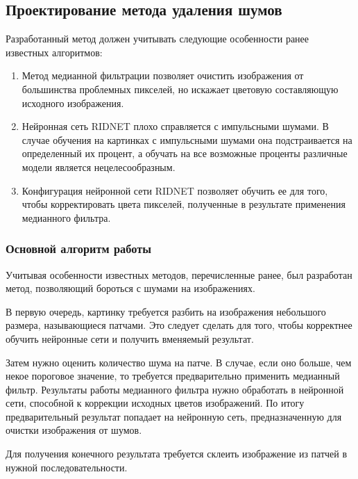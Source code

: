 \subsection{Проектирование метода удаления шумов}
Разработанный метод должен учитывать следующие особенности ранее известных алгоритмов:
\begin{enumerate}
	\item Метод медианной фильтрации позволяет очистить изображения от большинства проблемных пикселей, но искажает цветовую составляющую исходного изображения.
	\item Нейронная сеть RIDNET плохо справляется с импульсными шумами. 
	В случае обучения на картинках с импульсными шумами она подстраивается на определенный их процент, а обучать на все возможные проценты различные модели является нецелесообразным.
	\item Конфигурация нейронной сети RIDNET позволяет обучить ее для того, чтобы корректировать цвета пикселей, полученные в результате применения медианного фильтра.
\end{enumerate}

\subsubsection{Основной алгоритм работы}
Учитывая особенности известных методов, перечисленные ранее, был разработан метод, позволяющий бороться с шумами на изображениях.

В первую очередь, картинку требуется разбить на изображения небольшого размера, называющиеся патчами.
Это следует сделать для того, чтобы корректнее обучить нейронные сети и получить вменяемый результат.

Затем нужно оценить количество шума на патче.
В случае, если оно больше, чем некое пороговое значение, то требуется предварительно применить медианный фильтр.
Результаты работы медианного фильтра нужно обработать в нейронной сети, способной к коррекции исходных цветов изображений.
По итогу предварительный результат попадает на нейронную сеть, предназначенную для очистки изображения от шумов.

Для получения конечного результата требуется склеить изображение из патчей в нужной последовательности.

